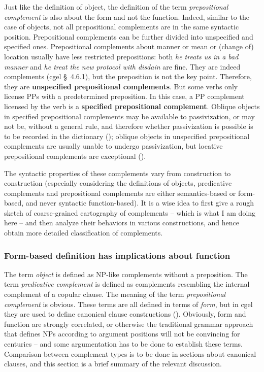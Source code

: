 \documentclass{article}
\newcommand*{\citesec}[1]{\S~{#1}}
\newcommand*{\concept}[1]{\textbf{#1}}
\newcommand*{\term}[1]{\emph{#1}}
\newcommand*{\corpus}[1]{\emph{#1}}
\begin{document}
Just like the definition of object, 
the definition of the term \term{prepositional complement} is also about the form and not the function.
Indeed, similar to the case of objects,
not all prepositional complements are in the same syntactic position.
Prepositional complements can be further divided into unspecified and specified ones.
Prepositional complements about manner or mean or (change of) location usually have less restricted prepositions:
both \corpus{he treats us in a bad manner} and \corpus{he treat the new protocol with disdain} are fine.
They are indeed complements (\ac{cgel} \citesec{4.6.1}),
but the preposition is not the key point.
Therefore, they are \concept{unspecified prepositional complements}.
But some verbs only license PPs with a predetermined preposition.
In this case, a PP complement licensed by the verb is a \concept{specified prepositional complement}.
Oblique objects in specified prepositional complements may be available to passivization, 
or may not be, without a general rule, 
and therefore whether passivization is possible is to be recorded in the dictionary ();
oblique objects in unspecified prepositional complements are usually unable to undergo passivization,
but locative prepositional complements are exceptional ().

The syntactic properties of these complements vary from construction to construction
(especially considering the definitions of objects, predicative complements and prepositional complements 
are either semantics-based or form-based, and never syntactic function-based).
It is a wise idea to first give a rough sketch of coarse-grained cartography of complements
-- which is what I am doing here --
and then analyze their behaviors in various constructions, 
and hence obtain more detailed classification of complements.

\subsubsection{Form-based definition has implications about function}\label{sec:complement-form-function}

The term \term{object} is defined as NP-like complements without a preposition.
The term \term{predicative complement} is defined as 
complements resembling the internal complement of a copular clause.
The meaning of the term \term{prepositional complement} is obvious.
These terms are all defined in terms of \emph{form},
but in \ac{cgel} they are used to define canonical clause constructions
().
Obviously, form and function are strongly correlated,
or otherwise the traditional grammar approach that defines NPs according to argument positions 
will not be convincing for centuries -- 
and some argumentation has to be done to establish these terms.
Comparison between complement types is to be done in sections about canonical clauses,
and this section is a brief summary of the relevant discussion.
\end{document}
